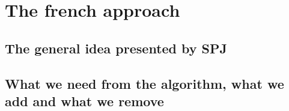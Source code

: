 \chapter{The french approach}


\section{The general idea presented by SPJ}

\section{What we need from the algorithm, what we add and what we remove}
